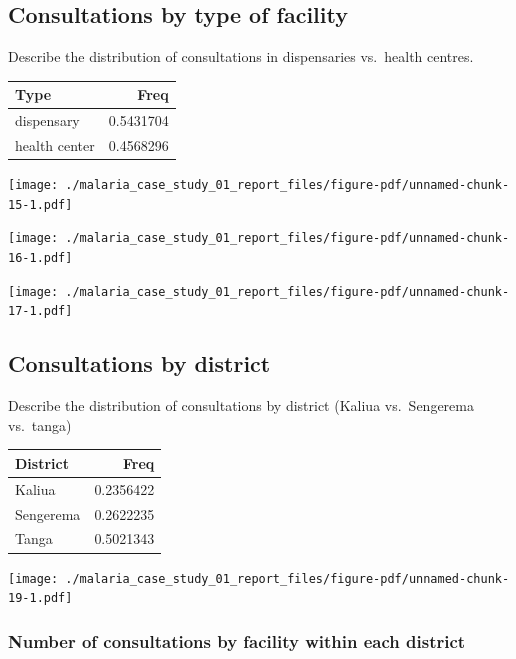 \documentclass[
  letterpaper,
  DIV=11,
  numbers=noendperiod,
  oneside]{scrreprt}
\begin{document}
\hypertarget{consultations-by-type-of-facility}{%
\subsection{Consultations by type of
facility}\label{consultations-by-type-of-facility}}

Describe the distribution of consultations in dispensaries vs.~health
centres.

\begin{longtable}[]{@{}lr@{}}
\toprule()
Type & Freq \\
\midrule()
\endhead
dispensary & 0.5431704 \\
health center & 0.4568296 \\
\bottomrule()
\end{longtable}

\texttt{[image: ./malaria\_case\_study\_01\_report\_files/figure-pdf/unnamed-chunk-15-1.pdf]}

\texttt{[image: ./malaria\_case\_study\_01\_report\_files/figure-pdf/unnamed-chunk-16-1.pdf]}

\texttt{[image: ./malaria\_case\_study\_01\_report\_files/figure-pdf/unnamed-chunk-17-1.pdf]}

\hypertarget{consultations-by-district}{%
\subsection{Consultations by district}\label{consultations-by-district}}

Describe the distribution of consultations by district (Kaliua
vs.~Sengerema vs.~tanga)

\begin{longtable}[]{@{}lr@{}}
\toprule()
District & Freq \\
\midrule()
\endhead
Kaliua & 0.2356422 \\
Sengerema & 0.2622235 \\
Tanga & 0.5021343 \\
\bottomrule()
\end{longtable}

\texttt{[image: ./malaria\_case\_study\_01\_report\_files/figure-pdf/unnamed-chunk-19-1.pdf]}

\hypertarget{number-of-consultations-by-facility-within-each-district}{%
\subsubsection{Number of consultations by facility within each
district}\label{number-of-consultations-by-facility-within-each-district}}
\end{document}
